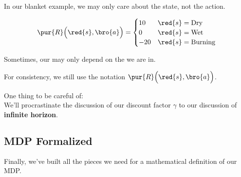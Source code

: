         \miniex In our blanket example, we may only care about the state, not the action.

        \begin{equation}
            \pur{R} \Big( \red{s},\bro{a} \Big) =
            \begin{cases}
                10 & \red{s} = \text{Dry} \\
                0 & \red{s} = \text{Wet} \\
                -20 & \red{s} = \text{Burning}
            \end{cases}
        \end{equation}

        \begin{concept}
            Sometimes, our  may only depend on the  we are in. 

            For consistency, we still use the notation $\pur{R} \Big( \red{s},\bro{a} \Big)$.
        \end{concept}

        One thing to be careful of:\\

        We'll procrastinate the discussion of our discount factor $\gamma$ to our discussion of \textbf{infinite horizon}.


    \pagebreak

    

    \subsection{MDP Formalized}

        Finally, we've built all the pieces we need for a mathematical definition of our MDP.\\

